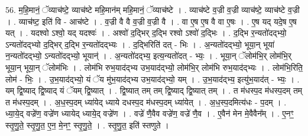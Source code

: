 \documentclass[17pt]{extarticle}
\begin{document}
56. म॒हि॒मानं॒ ॅव्याच॑ष्टे॒ व्याच॑ष्टे महि॒मान॑म् महि॒मानं॒ ॅव्याच॑ष्टे । . व्याच॑ष्टे व॒ज्री व॒ज्री व्याच॑ष्टे॒ व्याच॑ष्टे व॒ज्री । . व्याच॑ष्ट॒ इति॑ वि - आच॑ष्टे । . व॒ज्री वै वै व॒ज्री व॒ज्री वै । . वा ए॒ष ए॒ष वै वा ए॒षः । . ए॒ष यद् यदे॒ष ए॒ष यत् । . यदश्वो ऽश्वो॒ यद् यदश्वः॑ । . अश्वो॑ द॒द्भिर् द॒द्भि रश्वो ऽश्वो॑ द॒द्भिः । . द॒द्भि र॒न्यतो॑दद्भ्यो॒ ऽन्यतो॑दद्भ्यो द॒द्भिर् द॒द्भि र॒न्यतो॑दद्भ्यः । . द॒द्भिरिति॑ दत् - भिः । . अ॒न्यतो॑दद्भ्यो॒ भूया॒न् भूया॑ न॒न्यतो॑दद्भ्यो॒ ऽन्यतो॑दद्भ्यो॒ भूयान्॑ । . अ॒न्यतो॑दद्भ्य॒ इत्य॒न्यतो॑दत् - भ्यः॒ । . भूया॒न् ॅलोम॑भि॒र् लोम॑भि॒र् भूया॒न् भूया॒न् ॅलोम॑भिः । . लोम॑भि रुभ॒याद॑द्भ्य उभ॒याद॑द्भ्यो॒ लोम॑भि॒र् लोम॑भि रुभ॒याद॑द्भ्यः । . लोम॑भि॒रिति॒ लोम॑ - भिः॒ । . उ॒भ॒याद॑द्भ्यो॒ यं ॅय मु॑भ॒याद॑द्भ्य उभ॒याद॑द्भ्यो॒ यम् । . उ॒भ॒याद॑द्भ्य॒ इत्यु॑भ॒याद॑त् - भ्यः॒ । . यम् द्वि॒ष्याद् द्वि॒ष्याद् यं ॅयम् द्वि॒ष्यात् । . द्वि॒ष्यात् तम् तम् द्वि॒ष्याद् द्वि॒ष्यात् तम् । . त म॑धस्प॒द म॑धस्प॒दम् तम् त म॑धस्प॒दम् । . अ॒ध॒स्प॒दम् ध्या॑येद् ध्याये दधस्प॒द म॑धस्प॒दम् ध्या॑येत् । . अ॒ध॒स्प॒दमित्य॑धः - प॒दम् । . ध्या॒ये॒द् वज्रे॑ण॒ वज्रे॑ण ध्यायेद् ध्याये॒द् वज्रे॑ण । . वज्रे॑ णै॒वैव वज्रे॑ण॒ वज्रे॑ णै॒व । . ए॒वैन॑ मेन मे॒वैवैन᳚म् । . ए॒नꣳ॒॒ स्तृ॒णु॒ते॒ स्तृ॒णु॒त॒ ए॒न॒ मे॒नꣳ॒॒ स्तृ॒णु॒ते॒ । . स्तृ॒णु॒त॒ इति॑ स्तणुते । \newline
\end{document}
